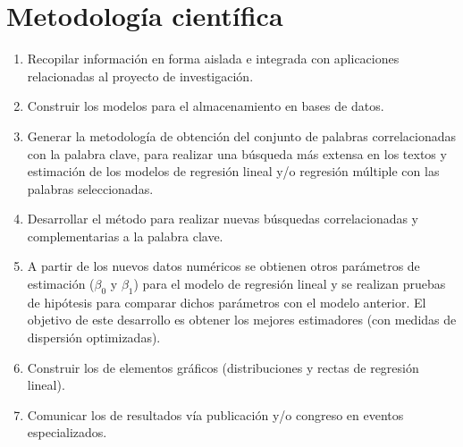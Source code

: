 \section {Metodología científica}
\begin{enumerate}
\item Recopilar información en forma aislada e integrada con aplicaciones relacionadas al proyecto de investigación.
\item Construir los modelos para el almacenamiento en bases de datos.
\item Generar la metodología de obtención del conjunto de palabras correlacionadas con la palabra clave, para realizar una búsqueda más extensa en los textos y estimación de los modelos de regresión lineal y/o regresión múltiple con las palabras seleccionadas.
\item Desarrollar el método para realizar nuevas búsquedas correlacionadas y complementarias a la palabra clave.
\item A partir de los nuevos datos numéricos se obtienen otros parámetros de estimación ($\beta_0$ y $\beta_1$) para el modelo de regresión lineal y se realizan pruebas de hipótesis para comparar dichos parámetros con el modelo anterior. El objetivo de este desarrollo es obtener los mejores estimadores (con medidas de dispersión optimizadas).
\item Construir los de elementos gráficos (distribuciones y rectas de regresión lineal).
\item Comunicar los de resultados vía publicación y/o congreso en eventos especializados.
\end{enumerate}